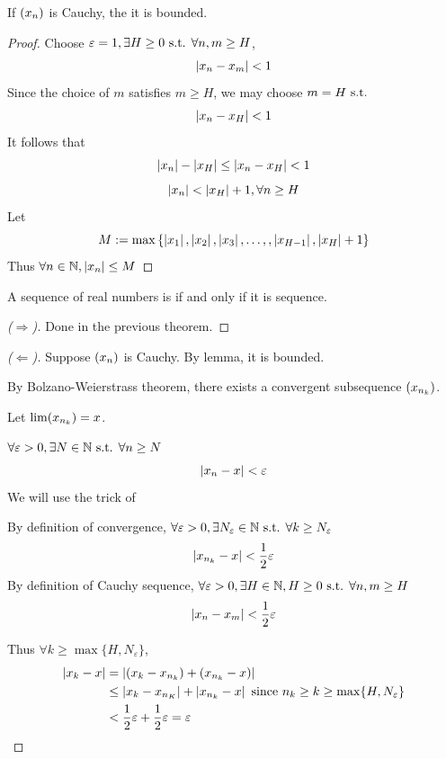 \documentclass[a4paper,12pt]{article}
\begin{document}
\begin{lemma}
    If \((x_{n})\) is Cauchy, the it is bounded.
    \begin{proof}
        Choose \(\varepsilon=1,\exists H\ge 0 \text{ s.t. } \forall n,m\ge H\),
        \[\left\lvert x_n-x_m\right\rvert<1\]
        Since the choice of \(m\) satisfies \(m\ge H\), we may choose \(m=H\text{ s.t. }\)
        \[\left\lvert x_n-x_H\right\rvert<1\]
        It follows that 
        \[\left\lvert x_n\right\rvert-\left\lvert x_H\right\rvert\le\left\lvert x_n-x_H\right\rvert<1\]
        \[\left\lvert x_n\right\rvert<\left\lvert x_H\right\rvert+1,\forall n\ge H\]
        Let 
        \[M:=\max{\{\left\lvert x_1\right\rvert,\left\lvert x_2\right\rvert,\left\lvert x_3\right\rvert,\dots,,\left\lvert x_{H-1}\right\rvert,\left\lvert x_H\right\rvert+1\}}\]
        Thus \(\forall n\in\mathbb{N}, \left\lvert x_n\right\rvert\le M\)
    \end{proof}
\end{lemma}

\begin{theorem}
    A sequence of real numbers is  if and only if it is  sequence.
    \begin{proof}[(\(\Rightarrow\))]
        Done in the previous theorem.
    \end{proof}
    \begin{proof}[(\(\Leftarrow\))]
        Suppose \((x_{n})\) is Cauchy. By lemma, it is bounded.

        By Bolzano-Weierstrass theorem, there exists a convergent subsequence \((x_{n_k})\). 
        
        Let \(\lim(x_{n_k})=x\).

         \(\forall \varepsilon>0, \exists N\in\mathbb{N} \text{ s.t. } \forall n\ge N\)
        \[\left\lvert x_n-x\right\rvert<\varepsilon\]
        We will use the trick of 

        By definition of convergence, \(\forall \varepsilon>0, \exists N_\varepsilon\in\mathbb{N} \text{ s.t. } \forall k\ge N_\varepsilon\)
        \[\left\lvert x_{n_k}-x\right\rvert<\frac{1}{2}\varepsilon\]
        By definition of Cauchy sequence, \(\forall \varepsilon>0, \exists H\in\mathbb{N},H\ge 0 \text{ s.t. } \forall n,m\ge H\)
        \[\left\lvert x_n-x_m\right\rvert<\frac{1}{2}\varepsilon\]
        
        Thus \(\forall k\ge \max\{H,N_\varepsilon\}\),
        \begin{align*}
            \left\lvert x_k-x\right\rvert &= \left\lvert (x_k-x_{n_k})+(x_{n_k}-x)\right\rvert\\
            &\le \left\lvert x_k-x_{n_K}\right\rvert+\left\lvert x_{n_k}-x\right\rvert\text{ since }n_k\ge k\ge \max\{H, N_\varepsilon\}\\
            &<\frac{1}{2}\varepsilon+\frac{1}{2}\varepsilon=\varepsilon
        \end{align*}
    \end{proof}
\end{theorem}
\end{document}
